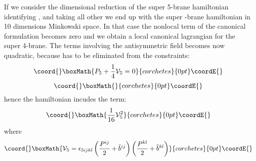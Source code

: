 \documentclass[a4paper,12pt]{article}
\def\CV{\cal{V}}
\begin{document}
If we consider the dimensional reduction of the super 5-brane
hamiltonian identifying  \coordHE{}, and taking all other
\coordHE{} we end up with the super \coordHE{}-brane hamiltonian
in 10 dimensions Minkowski space. In that case the nonlocal term
of the  canonical formulation becomes zero and we obtain a local
canonical lagrangian for the super 4-brane. The terms involving
the antisymmetric field becomes now quadratic, because \coordHE{} has
to be eliminated from the constraints:
\[\coord{}\boxMath{P_5+{1\over 4}{\CV}_5=0}{corchetes}{0pt}\coordE{}\]
\[\coord{}\boxMath{
}{corchetes}{0pt}\coordE{}\]
hence the hamiltonian incudes the term:
\[\coord{}\boxMath{ {1\over 16} {\CV}_5^2 }{corchetes}{0pt}\coordE{}\]
where
\[\coord{}\boxMath{
{\CV}_5=\epsilon_{5ijkl}\left({{P^{ij}}\over2}+\tilde{b}^{ij}
\right)\left({{P^{kl}}\over2}+\tilde{b}^{kl} \right)
}{corchetes}{0pt}\coordE{}\]




\newpage %
















\appendix

\end{document}
